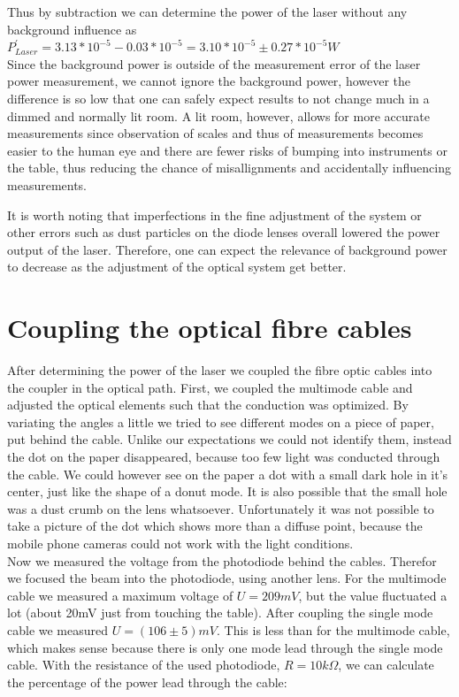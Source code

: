\documentclass{article}
\begin{document}
Thus by subtraction we can determine the power of the laser without any background influence as\\

$P^{'}_{Laser} = 3.13*10^{-5}- 0.03*10^{-5} =3.10*10^{-5} \pm 0.27*10^{-5}W$\\

Since the background power is outside of the measurement error of
the laser power measurement, we cannot ignore the background power, however the difference is so low that one can safely expect results to not change much in a dimmed and normally lit room. A lit room, however, allows for more accurate measurements since observation of scales and thus of measurements becomes easier to the human eye and there are fewer risks of bumping into instruments or the table, thus reducing the chance of misallignments and accidentally influencing measurements.

It is worth noting that imperfections in the fine adjustment of the system or other errors such as dust particles on the diode lenses overall lowered the power output of the laser. Therefore, one can expect the relevance of background power to decrease as the adjustment of the optical system get better.


\section{Coupling the optical fibre cables}

After determining the power of the laser we coupled the fibre optic cables into the coupler in the optical path. First, we coupled the multimode cable and adjusted the optical elements such that the conduction was optimized. By variating the angles a little we tried to see different modes on a piece of paper, put behind the cable. Unlike our expectations we could not identify them, instead the dot on the paper disappeared, because too few light was conducted through the cable. We could however see on the paper a dot with a small dark hole in it's center, just like the shape of a donut mode. It is also possible that the small hole was a dust crumb on the lens whatsoever. Unfortunately it was not possible to take a picture of the dot which shows more than a diffuse point, because the mobile phone cameras could not work with the light conditions.\\

Now we measured the voltage from the photodiode behind the cables. Therefor we focused the beam into the photodiode, using another lens. For the multimode cable we measured a maximum voltage of $U=209mV$, but the value fluctuated a lot (about 20mV just from touching the table). After coupling the single mode cable we measured $U=(106 \pm 5)mV$. This is less than for the multimode cable, which makes sense because there is only one mode lead through the single mode cable. With the resistance of the used photodiode, $R = 10k\Omega$, we can calculate the percentage of the power lead through the cable:\\
\end{document}
